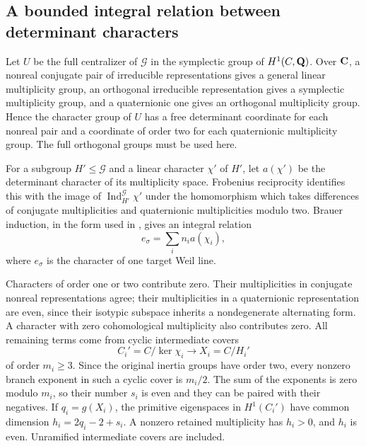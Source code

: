 \subsection{A bounded integral relation between determinant characters}

Let $U$ be the full centralizer of $\mathcal G$ in the symplectic group
of $H^1(C,\mathbf Q)$. Over $\mathbf C$, a nonreal conjugate pair of irreducible
representations gives a general linear multiplicity group, an orthogonal
irreducible representation gives a symplectic multiplicity group, and
a quaternionic one gives an orthogonal multiplicity group. Hence the
character group of $U$ has a free determinant coordinate for each
nonreal pair and a coordinate of order two for each quaternionic
multiplicity group. The full orthogonal groups must be used here.

For a subgroup $H'\le\mathcal G$ and a linear character $\chi'$ of
$H'$, let $a(\chi')$ be the determinant character of its multiplicity
space. Frobenius reciprocity identifies this with the image of
$\operatorname{Ind}_{H'}^{\mathcal G}\chi'$ under the homomorphism
which takes differences of conjugate multiplicities and quaternionic
multiplicities modulo two. Brauer induction, in the form used in
\cite[Theorem~5.1]{Severn}, gives an integral relation
\begin{equation}\label{eq:eis-supplier-relation}
 e_\sigma=\sum_i n_i a(\chi_i),
\end{equation}
where $e_\sigma$ is the character of one target Weil line.

Characters of order one or two contribute zero. Their multiplicities
in conjugate nonreal representations agree; their multiplicities in
a quaternionic representation are even, since their isotypic subspace
inherits a nondegenerate alternating form. A character with zero
cohomological multiplicity also contributes zero. All remaining terms
come from cyclic intermediate covers
\[
 C_i'=C/\ker\chi_i\longrightarrow X_i=C/H_i'
\]
of order $m_i\ge3$. Since the original inertia groups have order two,
every nonzero branch exponent in such a cyclic cover is $m_i/2$.
The sum of the exponents is zero modulo $m_i$, so their number $s_i$ is
even and they can be paired with their negatives. If $q_i=g(X_i)$,
the primitive eigenspaces in $H^1(C_i')$ have common dimension
$h_i=2q_i-2+s_i$. A nonzero retained multiplicity has $h_i>0$, and
$h_i$ is even. Unramified intermediate covers are included.


